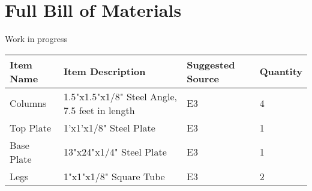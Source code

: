 \documentclass[11pt]{article}
\begin{document}
\section{Full Bill of Materials}
Work in progress
\begin{center}
	\begin{tabu} to \linewidth { |X[l]|X[2,l]|X[l]|X[0.7,r]| }
		\hline
		\textbf{Item Name} & \textbf{Item Description} & \textbf{Suggested Source} & \textbf{Quantity} \\
		\hline
		Columns & 1.5"x1.5"x1/8" Steel Angle, 7.5 feet in length & E3 & 4 \\
		\hline
		Top Plate & 1'x1'x1/8" Steel Plate & E3 & 1 \\
		\hline
		Base Plate & 13"x24"x1/4" Steel Plate & E3 & 1 \\
		\hline
		Legs & 1"x1"x1/8" Square Tube & E3 & 2 \\
		\hline
		
	\end{tabu}
\end{center}
\end{document}
